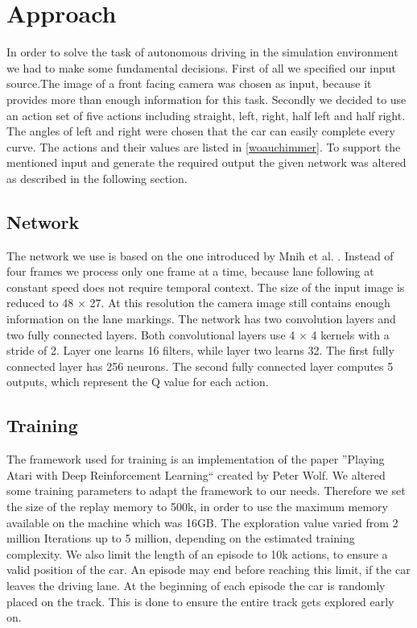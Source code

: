 
\section{Approach}\label{sec:approach}

In order to solve the task of autonomous driving in the simulation environment we had to make some fundamental decisions. First of all we specified our input source.The image of a front facing camera was chosen as input, because it provides more than enough information for this task. Secondly we decided to use an action set of five actions including straight, left, right, half left and half right. The angles of left and right were chosen that the car can easily complete every curve. The actions and their values are listed in \ref{woauchimmer}. To support the mentioned input and generate the required output the given network was altered as described in the following section.

\subsection{Network}
The network we use is based on the one introduced by Mnih et al. \cite{Mnih13}. Instead of four frames we process only one frame at a time, because lane following at constant speed does not require temporal context. The size of the input image is reduced to 48 $\times$ 27. At this resolution the camera image still contains enough information on the lane markings. The network has two convolution layers and two fully connected layers. Both convolutional layers use 4 $\times$ 4 kernels with a stride of 2. Layer one learns 16 filters, while layer two learns 32. The first fully connected layer has 256 neurons. The second fully connected layer computes 5 outputs, which represent the Q value for each action.


\subsection{Training}
The framework used for training is an implementation of the paper ''Playing Atari with Deep Reinforcement Learning``  created by Peter Wolf. We altered some training parameters to adapt the framework to our needs. Therefore we set the size of the replay memory to 500k, in order to use the maximum memory available on the machine which was 16GB. The exploration value varied from 2 million Iterations up to 5 million, depending on the estimated training complexity. We also limit the length of an episode to 10k actions, to ensure a valid position of the car. An episode may end before reaching this limit, if the car leaves the driving lane. At the beginning of each episode the car is randomly placed on the track. This is done to ensure the entire track gets explored early on.

